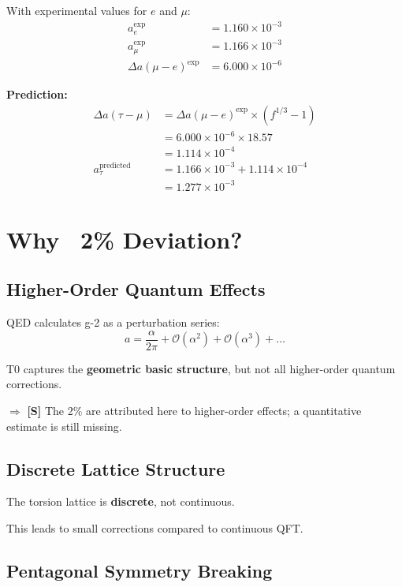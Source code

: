 	With experimental values for $e$ and $\mu$:
	\begin{align}
		a_e^{\text{exp}} &= 1.160 \times 10^{-3} \\
		a_\mu^{\text{exp}} &= 1.166 \times 10^{-3} \\
		\Delta a(\mu - e)^{\text{exp}} &= 6.000 \times 10^{-6}
	\end{align}
	
	\textbf{Prediction:}
	\begin{align}
		\Delta a(\tau - \mu) &= \Delta a(\mu - e)^{\text{exp}} \times (f^{1/3} - 1) \\
		&= 6.000 \times 10^{-6} \times 18.57 \\
		&= 1.114 \times 10^{-4} \\
		a_\tau^{\text{predicted}} &= 1.166 \times 10^{-3} + 1.114 \times 10^{-4} \\
		&= 1.277 \times 10^{-3}
	\end{align}
	
	\section{Why ~2\% Deviation?}
	
	\subsection{Higher-Order Quantum Effects}
	
	QED calculates g-2 as a perturbation series:
	\begin{equation}
		a = \frac{\alpha}{2\pi} + \mathcal{O}(\alpha^2) + \mathcal{O}(\alpha^3) + \ldots
	\end{equation}
	
	T0 captures the \textbf{geometric basic structure}, but not all higher-order quantum corrections.
	
	$\Rightarrow$ \textbf{[S]} The 2\% are attributed here to higher-order effects; a quantitative estimate is still missing.
	
	\subsection{Discrete Lattice Structure}
	
	The torsion lattice is \textbf{discrete}, not continuous.
	
	This leads to small corrections compared to continuous QFT.
	
	\subsection{Pentagonal Symmetry Breaking}
	

